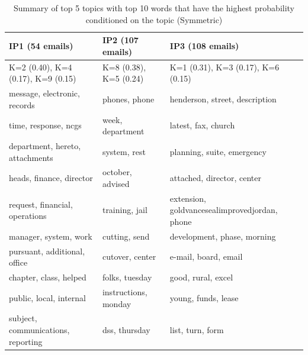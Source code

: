 \documentclass[a4paper]{article}
\begin{document}
		\begin{table}[ht]
			\centering
\begin{tabular}{|l||l||l|}
					\hline
					{\textbf{IP1} (54 emails)}&{\textbf{IP2} (107 emails)}&{\textbf{IP3} (108 emails)}\\
					\hline\hline
					K=2 (0.40), K=4 (0.17), K=9 (0.15) & K=8 (0.38), K=5 (0.24)& K=1 (0.31), K=3 (0.17), K=6 (0.15)\\
					\hline
					message, electronic, records&phones, phone& henderson, street, description\\
					time, response, ncgs & week, department& latest, fax, church\\
					department, hereto, attachments& system, rest& planning, suite, emergency\\
					heads, finance, director& october, advised& attached, director, center\\
					request, financial, operations& training, jail& extension, goldvancesealimprovedjordan, phone\\
					manager, system, work& cutting, send& development, phase, morning\\
					pursuant, additional, office & cutover, center& e-mail, board, email\\
					chapter, class, helped& folks, tuesday& good, rural, excel\\ 
					public, local, internal& instructions, monday& young, funds, lease\\
					subject, communications, reporting& dss, thursday& list, turn, form\\
					\hline
				\end{tabular}
				\caption {Summary of top 5 topics with top 10 words that have the highest probability conditioned on the topic (Symmetric)}
				\label{table:VancewordsMCMC}
			\end{table}
\end{document}
